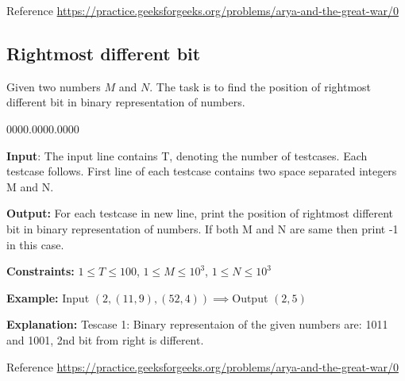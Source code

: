 \documentclass[10pt,spanish,9pt,a4]{article}
\newenvironment{c_list}[1]
	{\begin{list}{}
		{\settowidth{\labelwidth}{#1}
		 \setlength{\leftmargin}{\labelwidth}
		 \addtolength{\leftmargin}{\labelsep}
		 \renewcommand{\makelabel}[1]{##1\hfil}}}
	{\end{list}}
\begin{document}
Reference \url{https://practice.geeksforgeeks.org/problems/arya-and-the-great-war/0}

\subsection{Rightmost different bit}

Given two numbers $M$ and $N$. The task is to find the position
of rightmost different bit in binary representation of numbers.
\begin{c_list}{0000.0000.0000}
\item [{\textbf{Input}:}] The input line contains T, denoting the number
of testcases. Each testcase follows. First line of each testcase contains
two space separated integers M and N.
\item [{\textbf{Output:}}] For each testcase in new line, print the position
of rightmost different bit in binary representation of numbers. If
both M and N are same then print -1 in this case.
\item [{\textbf{Constraints:}}] $1\leq T\leq100$, $1\leq M\le10^{3}$,
$1\leq N\leq10^{3}$
\item [{\textbf{Example:}}] Input $\left(2,\left(11,9\right),\left(52,4\right)\right)\implies$Output
$\left(2,5\right)$
\end{c_list}
\textbf{Explanation:} Tescase 1: Binary representaion of the given
numbers are: 1011 and 1001, 2nd bit from right is different.

Reference \url{https://practice.geeksforgeeks.org/problems/arya-and-the-great-war/0}
\end{document}
